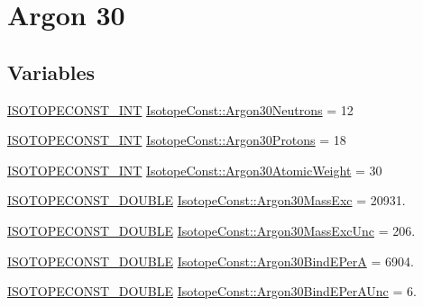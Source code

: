 \hypertarget{group___isotope_const-_argon-_ar30}{}\section{Argon 30}
\label{group___isotope_const-_argon-_ar30}
\subsection*{Variables}
\begin{DoxyCompactItemize}
\item 
\mbox{\hyperlink{group___isotope_const-_macros_ga5f18360b3e99483a35c32d789e62621c}{I\+S\+O\+T\+O\+P\+E\+C\+O\+N\+S\+T\+\_\+\+I\+NT}} \mbox{\hyperlink{group___isotope_const-_argon-_ar30_ga5febf3c83dcf4120078f83ef6531fff5}{Isotope\+Const\+::\+Argon30\+Neutrons}} = 12
\item 
\mbox{\hyperlink{group___isotope_const-_macros_ga5f18360b3e99483a35c32d789e62621c}{I\+S\+O\+T\+O\+P\+E\+C\+O\+N\+S\+T\+\_\+\+I\+NT}} \mbox{\hyperlink{group___isotope_const-_argon-_ar30_ga456754bdbd44996debaf5e08cedc75d2}{Isotope\+Const\+::\+Argon30\+Protons}} = 18
\item 
\mbox{\hyperlink{group___isotope_const-_macros_ga5f18360b3e99483a35c32d789e62621c}{I\+S\+O\+T\+O\+P\+E\+C\+O\+N\+S\+T\+\_\+\+I\+NT}} \mbox{\hyperlink{group___isotope_const-_argon-_ar30_ga42bf25b52ba36af9a4694a3529913161}{Isotope\+Const\+::\+Argon30\+Atomic\+Weight}} = 30
\item 
\mbox{\hyperlink{group___isotope_const-_macros_ga8f45a7272ce02c0b4c65c44636ed719a}{I\+S\+O\+T\+O\+P\+E\+C\+O\+N\+S\+T\+\_\+\+D\+O\+U\+B\+LE}} \mbox{\hyperlink{group___isotope_const-_argon-_ar30_ga42a0555c8307fb3c22a2a312eea7e055}{Isotope\+Const\+::\+Argon30\+Mass\+Exc}} = 20931.
\item 
\mbox{\hyperlink{group___isotope_const-_macros_ga8f45a7272ce02c0b4c65c44636ed719a}{I\+S\+O\+T\+O\+P\+E\+C\+O\+N\+S\+T\+\_\+\+D\+O\+U\+B\+LE}} \mbox{\hyperlink{group___isotope_const-_argon-_ar30_ga7834985eafd1728369d803a951ee6903}{Isotope\+Const\+::\+Argon30\+Mass\+Exc\+Unc}} = 206.
\item 
\mbox{\hyperlink{group___isotope_const-_macros_ga8f45a7272ce02c0b4c65c44636ed719a}{I\+S\+O\+T\+O\+P\+E\+C\+O\+N\+S\+T\+\_\+\+D\+O\+U\+B\+LE}} \mbox{\hyperlink{group___isotope_const-_argon-_ar30_ga9f6d3bebc064cf69018a884a74de8a88}{Isotope\+Const\+::\+Argon30\+Bind\+E\+PerA}} = 6904.
\item 
\mbox{\hyperlink{group___isotope_const-_macros_ga8f45a7272ce02c0b4c65c44636ed719a}{I\+S\+O\+T\+O\+P\+E\+C\+O\+N\+S\+T\+\_\+\+D\+O\+U\+B\+LE}} \mbox{\hyperlink{group___isotope_const-_argon-_ar30_gabe13c7771424b43166458f8f07def0f2}{Isotope\+Const\+::\+Argon30\+Bind\+E\+Per\+A\+Unc}} = 6.

\end{DoxyCompactItemize}
